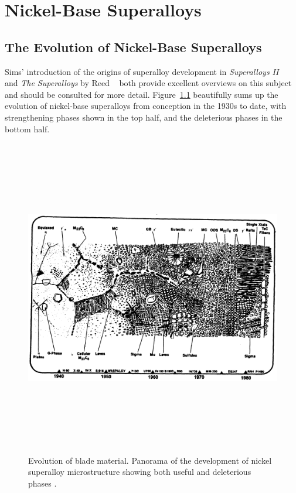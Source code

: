 \chapter{Nickel-Base Superalloys}
\section{The Evolution of Nickel-Base Superalloys}

Sims' introduction of the origins of superalloy development in \emph{Superalloys II} ~\cite{sims87} and \emph{The Superalloys} by Reed ~\cite{reed06} both provide excellent overviews on this subject and should be consulted for more detail.  Figure~\ref{fig:evolution} beautifully sums up the evolution of nickel-base superalloys from conception in the 1930s to date, with strengthening phases shown in the top half, and the deleterious phases in the bottom half.
%
\begin{figure}[htbp]
\begin{center}
\includegraphics[height=5.5in, angle=90.6]{SuperalloyEvolution}
\caption{Evolution of blade material.  Panorama of the development of nickel superalloy microstructure showing both useful and deleterious phases \cite{sims87}.}
\label{fig:evolution}
\end{center}
\end{figure}
